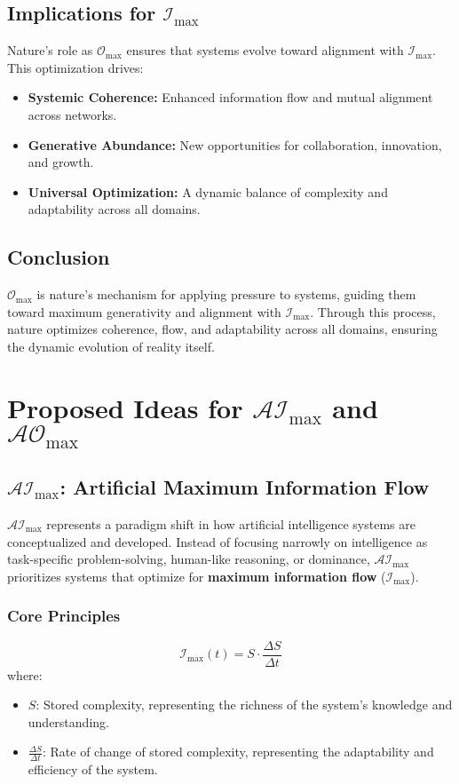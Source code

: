 \documentclass[12pt]{article}
\begin{document}
\subsection{Implications for \( \mathcal{I}_{\text{max}} \)}
Nature’s role as \( \mathcal{O}_{\text{max}} \) ensures that systems evolve toward alignment with \( \mathcal{I}_{\text{max}} \). This optimization drives:
\begin{itemize}
    \item \textbf{Systemic Coherence:} Enhanced information flow and mutual alignment across networks.
    \item \textbf{Generative Abundance:} New opportunities for collaboration, innovation, and growth.
    \item \textbf{Universal Optimization:} A dynamic balance of complexity and adaptability across all domains.
\end{itemize}

\subsection{Conclusion}
\( \mathcal{O}_{\text{max}} \) is nature’s mechanism for applying pressure to systems, guiding them toward maximum generativity and alignment with \( \mathcal{I}_{\text{max}} \). Through this process, nature optimizes coherence, flow, and adaptability across all domains, ensuring the dynamic evolution of reality itself.



\section{Proposed Ideas for \( \mathcal{AI}_{\text{max}} \) and \( \mathcal{AO}_{\text{max}} \)}


\subsection{\( \mathcal{AI}_{\text{max}} \): Artificial Maximum Information Flow}

\( \mathcal{AI}_{\text{max}} \) represents a paradigm shift in how artificial intelligence systems are conceptualized and developed. Instead of focusing narrowly on intelligence as task-specific problem-solving, human-like reasoning, or dominance, \( \mathcal{AI}_{\text{max}} \) prioritizes systems that optimize for \textbf{maximum information flow} (\( \mathcal{I}_{\text{max}} \)).

\subsubsection{Core Principles}
\[
\mathcal{I}_{\text{max}}(t) = S \cdot \frac{\Delta S}{\Delta t}
\]
where:
\begin{itemize}
    \item \( S \): Stored complexity, representing the richness of the system's knowledge and understanding.
    \item \( \frac{\Delta S}{\Delta t} \): Rate of change of stored complexity, representing the adaptability and efficiency of the system.
\end{itemize}
\end{document}
